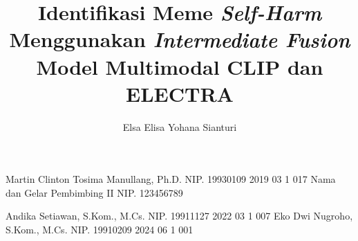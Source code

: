 \documentclass[article]{report} %
\begin{document}

    \title{Identifikasi Meme \textit{Self-Harm} Menggunakan \textit{Intermediate Fusion} Model Multimodal CLIP dan ELECTRA}

    \author{Elsa Elisa Yohana Sianturi}      %

    \dosbingA%
        {Martin Clinton Tosima Manullang, Ph.D.}%
        {NIP. 19930109 2019 03 1 017}              %
    \dosbingB%
        {Nama dan Gelar Pembimbing II}%
        {NIP. 123456789}                           %

    \pengujiA%
        {Andika Setiawan, S.Kom., M.Cs.}%
        {NIP. 19911127 2022 03 1 007}              %
    \pengujiB%
        {Eko Dwi Nugroho, S.Kom., M.Cs.}%
        {NIP. 19910209 2024 06 1 001}              %

    \sloppy %
    \setcounter{page}{1} %
\end{document}
